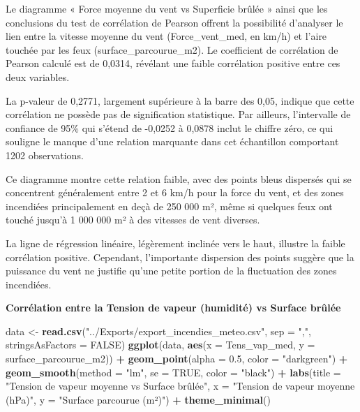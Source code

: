 \documentclass[
]{article}
\newenvironment{Shaded}{\begin{snugshade}}{\end{snugshade}}
\newcommand{\AttributeTok}[1]{\textcolor[rgb]{0.13,0.29,0.53}{#1}}
\newcommand{\ConstantTok}[1]{\textcolor[rgb]{0.56,0.35,0.01}{#1}}
\newcommand{\FloatTok}[1]{\textcolor[rgb]{0.00,0.00,0.81}{#1}}
\newcommand{\FunctionTok}[1]{\textcolor[rgb]{0.13,0.29,0.53}{\textbf{#1}}}
\newcommand{\NormalTok}[1]{#1}
\newcommand{\OtherTok}[1]{\textcolor[rgb]{0.56,0.35,0.01}{#1}}
\newcommand{\SpecialCharTok}[1]{\textcolor[rgb]{0.81,0.36,0.00}{\textbf{#1}}}
\newcommand{\StringTok}[1]{\textcolor[rgb]{0.31,0.60,0.02}{#1}}
\begin{document}
Le diagramme « Force moyenne du vent vs Superficie brûlée » ainsi que
les conclusions du test de corrélation de Pearson offrent la possibilité
d'analyser le lien entre la vitesse moyenne du vent (Force\_vent\_med,
en km/h) et l'aire touchée par les feux (surface\_parcourue\_m2). Le
coefficient de corrélation de Pearson calculé est de 0,0314, révélant
une faible corrélation positive entre ces deux variables.

La p-valeur de 0,2771, largement supérieure à la barre des 0,05, indique
que cette corrélation ne possède pas de signification statistique. Par
ailleurs, l'intervalle de confiance de 95\% qui s'étend de -0,0252 à
0,0878 inclut le chiffre zéro, ce qui souligne le manque d'une relation
marquante dans cet échantillon comportant 1202 observations.

Ce diagramme montre cette relation faible, avec des points bleus
dispersés qui se concentrent généralement entre 2 et 6 km/h pour la
force du vent, et des zones incendiées principalement en deçà de 250 000
m², même si quelques feux ont touché jusqu'à 1 000 000 m² à des vitesses
de vent diverses.

La ligne de régression linéaire, légèrement inclinée vers le haut,
illustre la faible corrélation positive. Cependant, l'importante
dispersion des points suggère que la puissance du vent ne justifie
qu'une petite portion de la fluctuation des zones incendiées.

\textbf{Corrélation entre la Tension de vapeur (humidité) vs Surface
brûlée}

\begin{Shaded}
\begin{Highlighting}[]
\NormalTok{data }\OtherTok{\textless{}{-}} \FunctionTok{read.csv}\NormalTok{(}\StringTok{"../Exports/export\_incendies\_meteo.csv"}\NormalTok{, }\AttributeTok{sep =} \StringTok{","}\NormalTok{, }\AttributeTok{stringsAsFactors =} \ConstantTok{FALSE}\NormalTok{)}
\FunctionTok{ggplot}\NormalTok{(data, }\FunctionTok{aes}\NormalTok{(}\AttributeTok{x =}\NormalTok{ Tens\_vap\_med, }\AttributeTok{y =}\NormalTok{ surface\_parcourue\_m2)) }\SpecialCharTok{+}
  \FunctionTok{geom\_point}\NormalTok{(}\AttributeTok{alpha =} \FloatTok{0.5}\NormalTok{, }\AttributeTok{color =} \StringTok{"darkgreen"}\NormalTok{) }\SpecialCharTok{+}
  \FunctionTok{geom\_smooth}\NormalTok{(}\AttributeTok{method =} \StringTok{"lm"}\NormalTok{, }\AttributeTok{se =} \ConstantTok{TRUE}\NormalTok{, }\AttributeTok{color =} \StringTok{"black"}\NormalTok{) }\SpecialCharTok{+}
  \FunctionTok{labs}\NormalTok{(}\AttributeTok{title =} \StringTok{"Tension de vapeur moyenne vs Surface brûlée"}\NormalTok{,}
       \AttributeTok{x =} \StringTok{"Tension de vapeur moyenne (hPa)"}\NormalTok{,}
       \AttributeTok{y =} \StringTok{"Surface parcourue (m²)"}\NormalTok{) }\SpecialCharTok{+}
  \FunctionTok{theme\_minimal}\NormalTok{()}
\end{Highlighting}
\end{Shaded}
\end{document}
